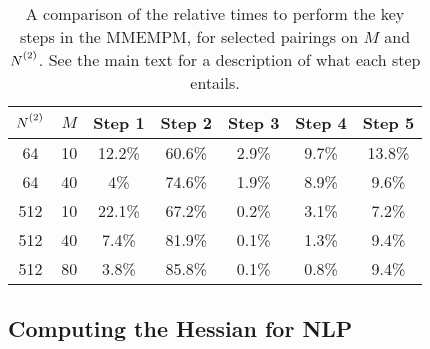 \begin{table}
    \begin{center}
        \begin{tabular}{ c c c c c c c }
            \toprule
            $\Ntwo$ &
            $M$ &
            Step 1 &
            Step 2 &
            Step 3 &
            Step 4 &
            Step 5 \\
            \midrule
            64 & 10 & 12.2\% & 60.6\% & 2.9\% & 9.7\% & 13.8\% \\
            64 & 40 & 4\% & 74.6\% & 1.9\% & 8.9\% & 9.6\% \\
            512 & 10 & 22.1\% & 67.2\% & 0.2\% & 3.1\% & 7.2\% \\
            512 & 40 & 7.4\% & 81.9\% & 0.1\% & 1.3\% & 9.4\% \\
            512 & 80 & 3.8\% & 85.8\% & 0.1\% & 0.8\% & 9.4\% \\
            \bottomrule
        \end{tabular}
    \end{center}
    \caption[
        A comparison of the relative times to perform the key steps in the \acs{MMEMPM}.
    ]{
        A comparison of the relative times to perform the key steps in the
        \acs{MMEMPM}, for selected pairings on $M$ and $\Ntwo$. See the main
        text for a description of what each step entails.
    }
    \label{tab:mmempm-steps}
\end{table}

\subsection{Computing the Hessian for \acs{NLP}}
